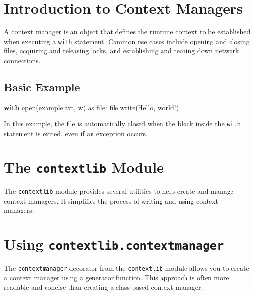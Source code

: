 \documentclass[
  letterpaper,
  DIV=11,
  numbers=noendperiod]{scrreprt}
\newenvironment{Shaded}{\begin{snugshade}}{\end{snugshade}}
\newcommand{\BuiltInTok}[1]{\textcolor[rgb]{0.00,0.23,0.31}{#1}}
\newcommand{\ControlFlowTok}[1]{\textcolor[rgb]{0.00,0.23,0.31}{\textbf{#1}}}
\newcommand{\ImportTok}[1]{\textcolor[rgb]{0.00,0.46,0.62}{#1}}
\newcommand{\NormalTok}[1]{\textcolor[rgb]{0.00,0.23,0.31}{#1}}
\newcommand{\StringTok}[1]{\textcolor[rgb]{0.13,0.47,0.30}{#1}}
\begin{document}
\section{Introduction to Context
Managers}\label{introduction-to-context-managers}

A context manager is an object that defines the runtime context to be
established when executing a \texttt{with} statement. Common use cases
include opening and closing files, acquiring and releasing locks, and
establishing and tearing down network connections.

\subsection{Basic Example}\label{basic-example}

\begin{Shaded}
\begin{Highlighting}[]
\ControlFlowTok{with} \BuiltInTok{open}\NormalTok{(}\StringTok{\textquotesingle{}example.txt\textquotesingle{}}\NormalTok{, }\StringTok{\textquotesingle{}w\textquotesingle{}}\NormalTok{) }\ImportTok{as} \BuiltInTok{file}\NormalTok{:}
    \BuiltInTok{file}\NormalTok{.write(}\StringTok{\textquotesingle{}Hello, world!\textquotesingle{}}\NormalTok{)}
\end{Highlighting}
\end{Shaded}

In this example, the file is automatically closed when the block inside
the \texttt{with} statement is exited, even if an exception occurs.

\section{\texorpdfstring{The \texttt{contextlib}
Module}{The contextlib Module}}\label{the-contextlib-module}

The \texttt{contextlib} module provides several utilities to help create
and manage context managers. It simplifies the process of writing and
using context managers.

\section{\texorpdfstring{Using
\texttt{contextlib.contextmanager}}{Using contextlib.contextmanager}}\label{using-contextlib.contextmanager}

The \texttt{contextmanager} decorator from the \texttt{contextlib}
module allows you to create a context manager using a generator
function. This approach is often more readable and concise than creating
a class-based context manager.
\end{document}
